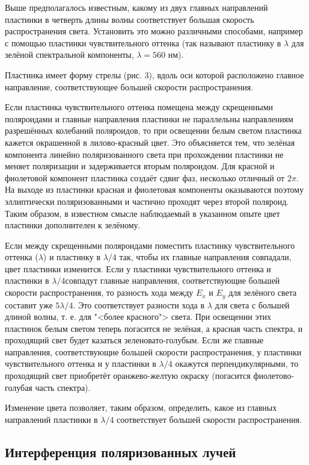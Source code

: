 \documentclass[12pt, a4paper]{article}
\begin{document}
Выше предполагалось известным, какому из двух главных направлений пластинки в
четверть длины волны соответствует большая скорость распространения света.
Установить это можно различными способами, например с помощью пластинки
чувствительного оттенка (так называют пластинку в $ \lambda $ для зелёной
спектральной компоненты, $ \lambda = 560 $ нм).

Пластинка имеет форму стрелы (рис. 3), вдоль оси которой расположено главное
направление, соответствующее большей скорости распространения.

Если пластинка чувствительного оттенка помещена между скрещенными поляроидами и
главные направления пластинки не параллельны направлениям разрешённых колебаний
поляроидов, то при освещении белым светом пластинка кажется окрашенной в
лилово-красный цвет. Это объясняется тем, что зелёная компонента линейно
поляризованного света при прохождении пластинки не меняет поляризации и
задерживается вторым поляроидом. Для красной и фиолетовой компонент пластинка
создаёт сдвиг фаз, несколько отличный от $ 2\pi $. На выходе из пластинки
красная и фиолетовая компоненты оказываются поэтому эллиптически
поляризованными и частично проходят через второй поляроид. Таким образом, в
известном смысле наблюдаемый в указанном опыте цвет пластинки дополнителен к
зелёному.

Если между скрещенными поляроидами поместить пластинку чувствительного оттенка
($ \lambda $) и пластинку в $ \lambda/4 $ так, чтобы их главные направления
совпадали, цвет пластинки изменится. Если у пластинки чувствительного оттенка и
пластинки в $ \lambda/4 $совпадут главные направления, соответствующие большей
скорости распространения, то разность хода между $ E_x $ и $ E_y $ для зелёного
света составит уже $ 5\lambda/4 $. Это соответствует разности хода в $ \lambda
$ для света с большей длиной волны, т. е. для "<более красного"> света. При
освещении этих пластинок белым светом теперь погасится не зелёная, а красная
часть спектра, и проходящий свет будет казаться зеленовато-голубым. Если же
главные направления, соответствующие большей скорости распространения, у
пластинки чувствительного оттенка и у пластинки в $ \lambda/4 $ окажутся
перпендикулярными, то проходящий свет приобретёт оранжево-желтую окраску
(погасится фиолетово-голубая часть спектра).

Изменение цвета позволяет, таким образом, определить, какое из главных
направлений пластинки в $ \lambda/4 $ соответствует большей скорости
распространения.

\newpage
\subsection{Интерференция поляризованных лучей}
\end{document}

